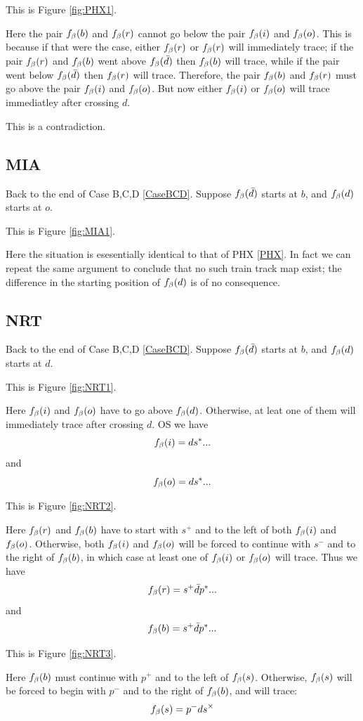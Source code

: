 This is Figure \ref{fig:PHX1}.

Here the pair $f_\beta(b)$ and $f_\beta(r)$ cannot go below the pair $f_\beta(i)$ and $f_\beta(o)$. This is because if that were the case, either $f_\beta(r)$ or $f_\beta(r)$ will immediately trace; if the pair $f_\beta(r)$ and $f_\beta(b)$ went above $f_\beta(\bar{d})$ then $f_\beta(b)$ will trace, while if the pair went below $f_\beta(\bar{d})$ then $f_\beta(r)$ will trace. Therefore, the pair $f_\beta(b)$ and $f_\beta(r)$ must go above the pair $f_\beta(i)$ and $f_\beta(o)$. But now either $f_\beta(i)$ or $f_\beta(o)$ will trace immediatley after crossing $d$.

This is a contradiction.

\subsection{MIA} \label{MIA}
Back to the end of Case B,C,D \ref{CaseBCD}. Suppose $f_\beta(\bar{d})$ starts at $b$, and $f_\beta(d)$ starts at $o$.

This is Figure \ref{fig:MIA1}.

Here the situation is esesentially identical to that of PHX \ref{PHX}. In fact we can repeat the same argument to conclude that no such train track map exist; the difference in the starting position of $f_\beta(d)$ is of no consequence.


\subsection{NRT} \label{NRT}
Back to the end of Case B,C,D \ref{CaseBCD}. Suppose $f_\beta(\bar{d})$ starts at $b$, and $f_\beta(d)$ starts at $d$.

This is Figure \ref{fig:NRT1}.

Here $f_\beta(i)$ and $f_\beta(o)$ have to go above $f_\beta(d)$. Otherwise, at leat one of them will immediately trace after crossing $d$. OS we have
\[
f_\beta(i) = d s^*...
\]
and
\[
f_\beta(o) = d s^*...
\]

This is Figure \ref{fig:NRT2}.

Here $f_\beta(r)$ and $f_\beta(b)$ have to start with $s^+$ and to the left of both $f_\beta(i)$ and $f_\beta(o)$. Otherwise, both $f_\beta(i)$ and $f_\beta(o)$ will be forced to continue with $s^-$ and to the right of $f_\beta(b)$, in which case at least one of $f_\beta(i)$ or $f_\beta(o)$ will trace. Thus we have
\[
f_\beta(r) = s^+ \bar{d} p^*...
\]
and
\[
f_\beta(b) = s^+ \bar{d} p^*...
\]

This is Figure \ref{fig:NRT3}.

Here $f_\beta(b)$ must continue with $p^+$ and to the left of $f_\beta(s)$. Otherwise, $f_\beta(s)$ will be forced to begin with $p^-$ and to the right of $f_\beta(b)$, and will trace:
\[
f_\beta(s) = p^- d s^\times
\]

